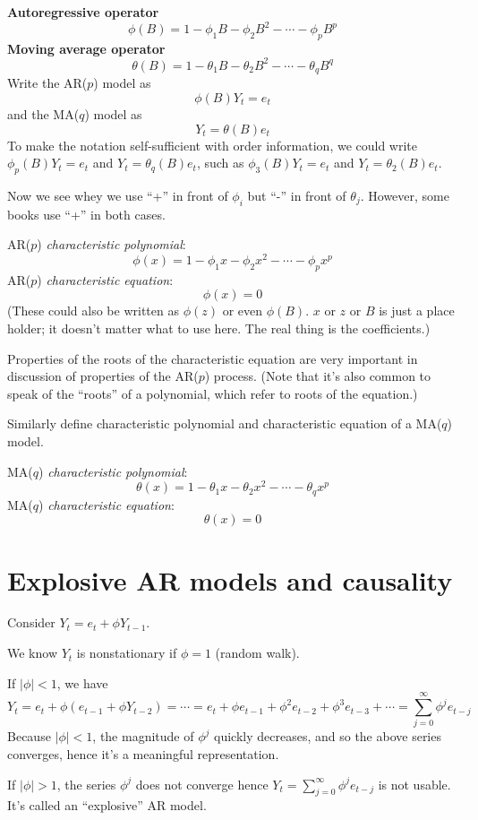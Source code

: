 \documentclass[12pt]{article}
\begin{document}
\textbf{Autoregressive operator}
\[
\phi(B) = 1 - \phi_1 B - \phi_2 B^2 - \dotsb - \phi_p B^p
\]
\textbf{Moving average operator}
\[
\theta(B) = 1 - \theta_1 B - \theta_2 B^2 - \dotsb - \theta_q B^q
\]
Write the AR($p$) model as
\[
\phi(B) Y_t = e_t
\]
and the MA($q$) model as
\[
Y_t = \theta(B) e_t
\]
To make the notation self-sufficient with order information, we could
write
$\phi_p(B) Y_t = e_t$ and $Y_t = \theta_q(B) e_t$,
such as
$\phi_3(B) Y_t = e_t$ and $Y_t = \theta_2(B) e_t$.

\alert
Now we see whey we use ``+'' in front of $\phi_i$ but
``-'' in front of $\theta_j$.
However, some books use ``+'' in both cases.

AR($p$) \emph{characteristic polynomial}:
\[
\phi(x) = 1 - \phi_1 x - \phi_2 x^2 -\dotsb- \phi_p x^p
\]
AR($p$) \emph{characteristic equation}:
\[
\phi(x) = 0
\]
(These could also be written as
$\phi(z)$ or even $\phi(B)$.
$x$ or $z$ or $B$ is just a place holder;
it doesn't matter what to use here.
The real thing is the coefficients.)

Properties of the roots of the characteristic equation
are very important in discussion of properties of the AR($p$) process.
(Note that it's also common to speak of the ``roots'' of a polynomial,
which refer to roots of the equation.)

Similarly define characteristic polynomial and characteristic equation
of a MA($q$) model.

MA($q$) \emph{characteristic polynomial}:
\[
\theta(x) = 1 - \theta_1 x - \theta_2 x^2 -\dotsb- \theta_q x^p
\]
MA($q$) \emph{characteristic equation}:
\[
\theta(x) = 0
\]


\section{Explosive AR models and causality}

Consider $Y_t = e_t + \phi Y_{t-1}$.

We know $Y_t$ is nonstationary if $\phi = 1$ (random walk).

If $|\phi| < 1$, we have
\[
Y_t
= e_t + \phi(e_{t-1} + \phi Y_{t-2})
= \dotsb
= e_t + \phi e_{t-1} + \phi^2 e_{t-2} + \phi^3 e_{t-3} +\dotsb
= \sum_{j=0}^{\infty} \phi^j e_{t-j}
\]
Because $|\phi| < 1$, the magnitude of $\phi^j$ quickly decreases,
and so the above series converges,
hence it's a meaningful representation.

If $|\phi| > 1$,
the series $\phi^j$ does not converge
hence $Y_t = \sum_{j=0}^\infty \phi^j e_{t-j}$ is not usable.
It's called an ``explosive'' AR model.
\end{document}
